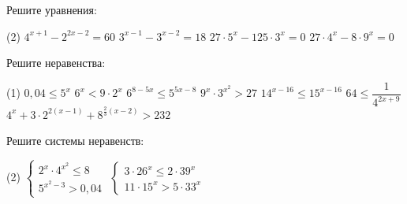 \begin{homework}[number=3]
	\begin{listofex}
		\item Решите уравнения:
		\begin{tasks}(2)
			\task \( 4^{x+1}-2^{2x-2}=60 \)
			\task \( 3^{x-1}-3^{x-2}=18 \)
			\task \( 27 \cdot 5^x-125 \cdot 3^x=0 \)
			\task \( 27 \cdot 4^x - 8 \cdot 9^x=0 \)
		\end{tasks}
		\item Решите неравенства: %
		\begin{tasks}(1)
			\task \( 0,04 \le 5^x \)
			\task \( 6^x<9 \cdot 2^x \)
			\task \( 6^{8-5x} \le 5^{5x-8} \)
			\task \( 9^x \cdot 3^{x^2} > 27 \)
			\task \( 14^{x-16} \le 15^{x-16} \)
			\task \( 64 \le \dfrac{1}{4^{2x+9}} \)
			\task \( 4^x + 3 \cdot 2^{2(x-1)}+8^{\frac{2}{3}(x-2)}>232 \)
		\end{tasks}
		\item Решите системы неравенств:
		\begin{tasks}(2)
			\task \( \begin{cases} 2^x \cdot 4 ^{x^2} \le 8 \\ 5^{x^2-3} > 0,04 \end{cases} \)
			\task \( \begin{cases} 3 \cdot 26^x \le 2 \cdot 39^x \\ 11 \cdot 15^x > 5 \cdot 33^x \end{cases} \)
		\end{tasks}
	\end{listofex}
\end{homework}
	
